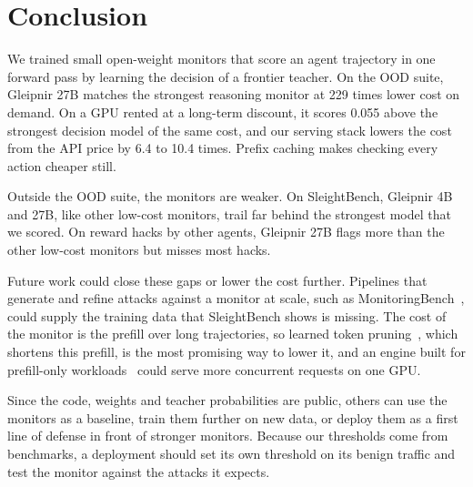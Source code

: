 \section{Conclusion}
\label{sec:conclusion}

We trained small open-weight monitors that score an agent trajectory in one forward pass by learning the decision of a frontier teacher.
On the OOD suite, Gleipnir 27B matches the strongest reasoning monitor at 229 times lower cost on demand.
On a GPU rented at a long-term discount, it scores 0.055 above the strongest decision model of the same cost, and our serving stack lowers the cost from the API price by 6.4 to 10.4 times.
Prefix caching makes checking every action cheaper still.

Outside the OOD suite, the monitors are weaker.
On SleightBench, Gleipnir 4B and 27B, like other low-cost monitors, trail far behind the strongest model that we scored.
On reward hacks by other agents, Gleipnir 27B flags more than the other low-cost monitors but misses most hacks.

Future work could close these gaps or lower the cost further.
Pipelines that generate and refine attacks against a monitor at scale, such as MonitoringBench~\citep{jotautaite2026monitoringbench}, could supply the training data that SleightBench shows is missing.
The cost of the monitor is the prefill over long trajectories, so learned token pruning~\citep{patel2026tokengate}, which shortens this prefill, is the most promising way to lower it, and an engine built for prefill-only workloads~\citep{du2025prefillonly} could serve more concurrent requests on one GPU.

Since the code, weights and teacher probabilities are public, others can use the monitors as a baseline, train them further on new data, or deploy them as a first line of defense in front of stronger monitors.
Because our thresholds come from benchmarks, a deployment should set its own threshold on its benign traffic and test the monitor against the attacks it expects.
